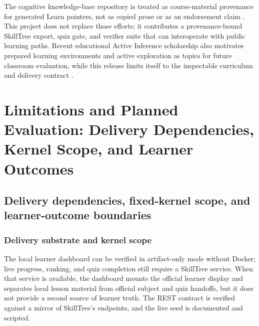 \documentclass[
  english,
]{article}
\begin{document}
The cognitive knowledge-base repository is treated as course-material
provenance for generated Learn pointers, not as copied prose or as an
endorsement claim \citep{activeinferenceinstitute2026cognitive}. This
project does not replace those efforts; it contributes a
provenance-bound SkillTree export, quiz gate, and verifier suite that
can interoperate with public learning paths. Recent educational Active
Inference scholarship also motivates prepared learning environments and
active exploration as topics for future classroom evaluation, while this
release limits itself to the inspectable curriculum and delivery
contract \citep{dipaolo2024school}.

\newpage

\section{Limitations and Planned Evaluation: Delivery Dependencies,
Kernel Scope, and Learner
Outcomes}\label{sec:limitations-delivery-dependencies-learner-outcomes}

\subsection{Delivery dependencies, fixed-kernel scope, and
learner-outcome
boundaries}\label{delivery-dependencies-fixed-kernel-scope-and-learner-outcome-boundaries}

\subsubsection{Delivery substrate and kernel
scope}\label{delivery-substrate-and-kernel-scope}

The local learner dashboard can be verified in artifact-only mode
without Docker; live progress, ranking, and quiz completion still
require a SkillTree service. When that service is available, the
dashboard mounts the official learner display and separates local lesson
material from official subject and quiz handoffs, but it does not
provide a second source of learner truth. The REST contract is verified
against a  mirror of SkillTree's endpoints,
and the live seed is documented and scripted.
\end{document}
